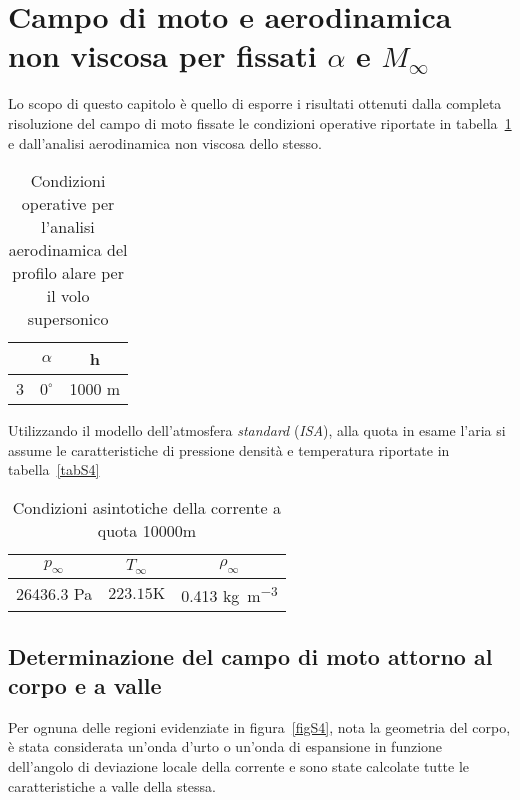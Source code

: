 
\section{Campo di moto e aerodinamica non viscosa per fissati $\alpha$ e $M_{\infty}$}
Lo scopo di questo capitolo è quello di esporre i risultati ottenuti dalla completa risoluzione del campo di moto fissate le condizioni operative riportate in tabella~\ref{tabS3} e dall'analisi aerodinamica non viscosa dello stesso.

\begin{table} [!h]\centering {}
	\begin{tabular}{c c c}
		\toprule
		\emph{\Minf } &  $\alpha$ & h \\ 
		\midrule
		3 & $0^{\circ}$ & 1000 m \\
		\bottomrule
	\end{tabular}
	\caption {\footnotesize Condizioni operative per l'analisi aerodinamica del profilo alare per il volo supersonico}
	\label{tabS3}
\end{table}

Utilizzando il modello dell'atmosfera \emph{standard} (\emph{ISA}), alla quota in esame l'aria si assume le caratteristiche di pressione densità e temperatura riportate in tabella~\vref{tabS4}

\begin{table} [!h]\centering {}
	\begin{tabular}{c c c}
		\toprule
		\emph{$p_{\infty}$ } &  \emph{$T_{\infty}$ } & \emph{$\rho_{\infty}$ } \\ 
		\midrule
		26436.3 \si{\pascal} & $223.15 \si{\kelvin}$ & 0.413 \si{\kilo\gram\per\cubic\meter}\\
		\bottomrule
	\end{tabular}
	\caption {\footnotesize Condizioni asintotiche della corrente a quota 10000\si{\meter}}
	\label{tabS4}
\end{table} 

\subsection{Determinazione del campo di moto attorno al corpo e a valle}
Per ognuna delle regioni evidenziate in figura~\vref{figS4},
nota la geometria del corpo, è stata considerata un'onda d'urto o un'onda di espansione in funzione dell'angolo di deviazione locale della corrente e sono state calcolate tutte le caratteristiche a valle della stessa.


